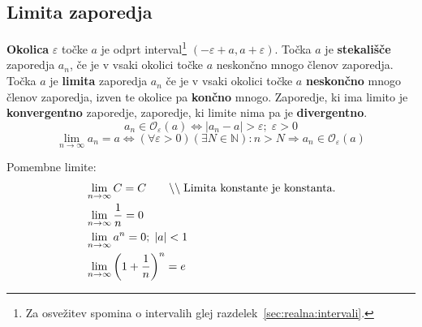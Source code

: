 \documentclass[a4paper,oneside,12pt,fleqn]{article}
\def\N{\ensuremath{\mathbb N}}
\newcommand{\comment}[1]{\ensuremath{\qquad\backslash\backslash\;}\textnormal{#1}}
\def\limi{\displaystyle\lim_{n\to\infty}} %
\renewcommand\implies\Rightarrow
\renewcommand\iff\Leftrightarrow
\numberwithin{equation}{section}
\begin{document}
\subsection{Limita zaporedja}
\label{sec:zap:lim}
\textbf{Okolica} $\varepsilon$ točke $a$ je odprt interval\footnote{Za osvežitev spomina o
intervalih glej razdelek~\ref{sec:realna:intervali}.} $(-\varepsilon+a, a+\varepsilon)$. Točka
$a$ je \textbf{stekališče} zaporedja $a_n$, če je v vsaki okolici točke $a$ neskončno mnogo členov
zaporedja. Točka $a$ je \textbf{limita} zaporedja $a_n$ če je v vsaki okolici točke $a$
\textbf{neskončno} mnogo členov zaporedja, izven te okolice pa \textbf{končno} mnogo. Zaporedje, ki ima limito je
\textbf{konvergentno} zaporedje, zaporedje, ki limite nima pa je \textbf{divergentno}.
\[ a_n \in \mathcal{O}_{\varepsilon}(a) \iff |a_n - a| > \varepsilon; \; \varepsilon > 0 \]
\[ \limi a_n = a \iff (\forall \varepsilon > 0)(\exists N \in \N): n > N \implies a_n \in
\mathcal{O}_{\varepsilon}(a) \]

Pomembne limite:
\begin{align}
  & \limi C = C \comment{Limita konstante je konstanta.} \label{eq:zap:lim:konst} \\
  & \limi \frac{1}{n} = 0  \label{eq:zap:lim:1n} \\
  & \limi a^n = 0; \; \left|a\right| < 1 \label{eq:zap:lim:an} \\
  & \limi \left(1 + \frac{1}{n}\right)^n = e \label{eq:zap:lim:e}
\end{align}
\end{document}
